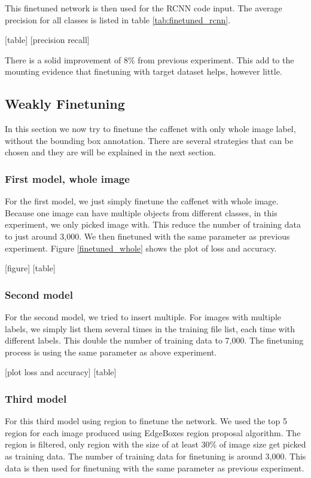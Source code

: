 \documentclass[a4paper,11pt]{kth-mag}
\begin{document}
This finetuned network is then used for the RCNN code input. The average precision for all classes is listed in table \ref{tab:finetuned_rcnn}.

[table]
[precision recall]

There is a solid improvement of 8\% from previous experiment. This add to the mounting evidence that finetuning with target dataset helps, however little.

\subsection{Weakly Finetuning}
In this section we now try to finetune the caffenet with only whole image label, without the bounding box annotation. There are several strategies that can be chosen and they are will be explained in the next section.

\subsubsection{First model, whole image}
For the first model, we just simply finetune the caffenet with whole image. Because one image can have multiple objects from different classes, in this experiment, we only picked image with. This reduce the number of training data to just around 3,000. We then finetuned with the same parameter as previous experiment. Figure \ref{finetuned_whole} shows the plot of loss and accuracy.

[figure]
[table]

\subsubsection{Second model}
For the second model, we tried to insert multiple. For images with multiple labels, we simply list them several times in the training file list, each time with different labels. This double the number of training data to 7,000. The finetuning process is using the same parameter as above experiment.

[plot loss and accuracy]
[table]

\subsubsection{Third model}
For this third model using region to finetune the network. We used the top 5 region for each image produced using EdgeBoxes region proposal algorithm. The region is filtered, only region with the size of at least 30\% of image size get picked as training data. The number of training data for finetuning is around 3,000. This data is then used for finetuning with the same parameter as previous experiment.
\end{document}
